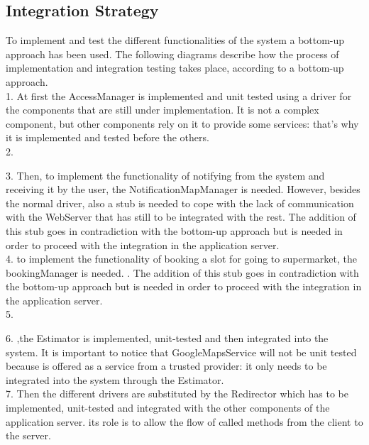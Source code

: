 \subsection{Integration Strategy}
\vspace{0.5cm}

To implement and test the different functionalities of the system a bottom-up approach has been used. The following diagrams describe how the process of implementation and integration testing takes place, according to a bottom-up approach. \\
1. At first the AccessManager is implemented and unit tested using a driver for
the components that are still under implementation. It is not a complex component, but
other components rely on it to provide some services: that’s why it is implemented and
tested before the others. \\
2.

3. Then, to implement the functionality of notifying from the system and receiving it by the user, the NotificationMapManager is needed. However, besides the normal driver, also a stub is needed to cope with the lack of communication with the WebServer that has still to be integrated with the rest. The addition of this stub goes in contradiction with the bottom-up approach but is needed in order to proceed with the integration in the application server.\\
4. to implement the functionality of booking a slot for going to supermarket, the bookingManager is needed. . The addition of this stub goes in
contradiction with the bottom-up approach but is needed in order to proceed with the integration in the application server.\\
5.

6. ,the Estimator is implemented, unit-tested and then integrated
into the system. It is important to notice that GoogleMapsService will not be unit tested because is offered as a service from a trusted provider: it only needs to be integrated into the system through the Estimator.\\
7. Then the different drivers are substituted by the Redirector which
has to be implemented, unit-tested and integrated with the other components of the application server. its role is to allow the flow of called methods from
the client to the server.\\
